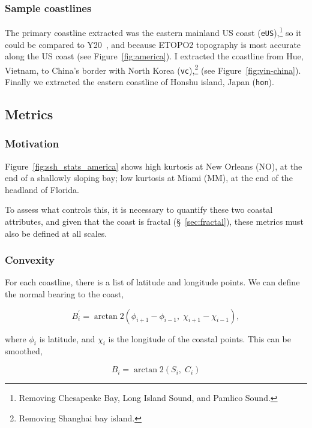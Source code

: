 \subsubsection{Sample coastlines}
\label{sec:coast-sample}
The primary coastline extracted was the eastern mainland US coast (\texttt{eUS}),\footnote{
Removing Chesapeake Bay, Long Island Sound, and Pamlico Sound.
}
so it could be compared to Y20~\cite{ZannaPreprint},
and because ETOPO2 topography is most accurate along the
US coast (see Figure~\ref{fig:america}).
I extracted the coastline from Hue, Vietnam, to China's
border with North Korea (\texttt{vc}),\footnote{
Removing Shanghai bay island.} (see Figure~\ref{fig:vin-china}).
Finally we extracted the eastern coastline
of Honshu island, Japan (\texttt{hon}).



\subsection{Metrics}
\subsubsection{Motivation}
Figure~\ref{fig:ssh_stats_america} shows
high kurtosis at New Orleans (NO), at the end of a shallowly sloping bay;
low kurtosis at Miami (MM), at the end of the headland of Florida.

To assess what controls this,
it is necessary to quantify these two coastal attributes,
and given that the coast is fractal (§~\ref{sec:fractal}),
these metrics must also be defined at all scales.

\subsubsection{Convexity}
\label{sec:convexity}

For each coastline,
there is a list of latitude and longitude points.
We can define the normal bearing to the coast,

\begin{equation}
B_i^{\prime}=\operatorname{arctan} 2
\left(\phi_{i+1}-\phi_{i-1},\; \chi_{i+1}-\chi_{i-1}\right),
\label{eq:bearing}
\end{equation}

where $\phi_{i}$ is latitude, and $\chi_{i}$ is the longitude of the coastal points.
This can be smoothed,

\begin{equation}
B_i=\operatorname{arctan} 2
\left(S_i,\; C_i\right)
\label{eq:bearing}
\end{equation}

